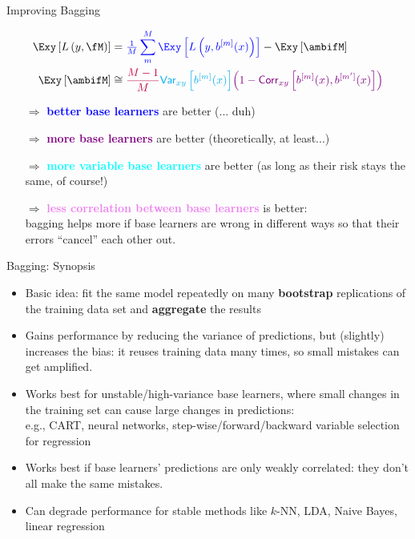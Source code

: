 \documentclass[11pt,compress,t,notes=noshow, xcolor=table]{beamer}
\begin{document}
\begin{vbframe}{Improving Bagging}
\begin{small}
\begin{align*}
\Exy\left[L\left(y, \fM\right)\right] &= \textcolor{blue}{\tfrac{1}{M}\sum^M_{m} \Exy\left[L\left(y, \blm \right)\right]} - \Exy\left[\ambifM\right]\\
\Exy\left[\ambifM\right] &\cong 
\textcolor{purple}{\frac{M-1}{M}} \textcolor{cyan}{\var_{xy}\left[\blm\right]} \textcolor{violet}{\left(1 - \corr_{xy}\left[\blm, \bl{m'}\right]\right)}
\end{align*}
\end{small}
\begin{itemize}
\item[$\Rightarrow$] \textcolor{blue}{\textbf{better base learners}} are better {\small (... duh)}
\item[$\Rightarrow$] \textcolor{purple}{\textbf{more base learners}} are better {\small (theoretically, at least...)}\\
\item[$\Rightarrow$] \textcolor{cyan}{\textbf{more variable base learners}} are better {\small(as long as their risk stays the same, of course!)}
\item[$\Rightarrow$] \textcolor{violet}{\textbf{less correlation between base learners}} is better:\\ bagging helps more if base learners are wrong in different ways so that their errors \enquote{cancel} each other out.\\
\end{itemize}


\end{vbframe}

\begin{vbframe}{Bagging: Synopsis}

  \begin{itemize}
    \item Basic idea: fit the same model repeatedly on many \textbf{bootstrap} replications of the training data set and \textbf{aggregate} the results
    \item Gains performance by reducing the variance of predictions, but (slightly) increases the bias: it reuses training data many times, so small mistakes can get amplified. 
    \item Works best for unstable/high-variance base learners, where small changes in the training set can cause large changes in predictions:\\
    e.g., CART, neural networks, step-wise/forward/backward variable selection for regression\\
     \item Works best if base learners' predictions are only weakly correlated: they don't all make the same mistakes.
         \item Can degrade performance for stable methods like $k$-NN, LDA, Naive Bayes, linear regression
  \end{itemize}
\end{vbframe}

\endlecture
\end{document}
